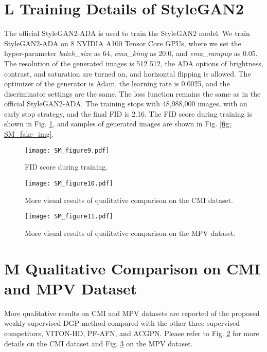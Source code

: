 \documentclass[10pt,twocolumn,letterpaper]{article}
\begin{document}
\section*{L Training Details of StyleGAN2}

The official StyleGAN2-ADA \cite{karras2020training} is used to train the StyleGAN2 model. We train StyleGAN2-ADA on 8 NVIDIA A100 Tensor Core GPUs, where we set the hyper-parameter \textit{batch\_size} as 64, \textit{ema\_kimg} as 20.0, and \textit{ema\_rampup} as 0.05. The resolution of the generated images is 512  512, the ADA options of brightness, contrast, and saturation are turned on, and horizontal flipping is allowed. The optimizer of the generator is Adam, the learning rate is 0.0025, and the discriminator settings are the same. The loss function remains the same as in the official StyleGAN2-ADA. The training stops with 48,988,000 images, with an early stop strategy, and the final FID is 2.16. The FID score during training is shown in Fig. \ref{fig: stylegan_fid}, and samples of generated images are shown in Fig. \ref{fig: SM_fake_img}.
\begin{figure}[t]
  \centering
  \texttt{[image: SM\_figure9.pdf]}
  \caption{FID score during training.}\label{fig: stylegan_fid}
\end{figure}

\clearpage

\begin{figure}[h]
  \centering
  \texttt{[image: SM\_figure10.pdf]}
  \caption{More visual results of qualitative comparison on the CMI dataset.}\label{fig: SM_compare_CMI}
\end{figure}


\begin{figure}[h]
  \centering
  \texttt{[image: SM\_figure11.pdf]}
  \caption{More visual results of qualitative comparison on the MPV dataset.}\label{fig: SM_compare_MPV}
\end{figure}

\clearpage



\section*{M Qualitative Comparison on CMI and MPV Dataset}
More qualitative results on CMI and MPV datasets are reported of the proposed weakly supervised DGP method compared with the other three supervised competitors, VITON-HD, PF-AFN, and ACGPN. Please refer to Fig. \ref{fig: SM_compare_CMI} for more details on the CMI dataset and Fig. \ref{fig: SM_compare_MPV} on the MPV dataset.


\clearpage
\twocolumn
\end{document}

